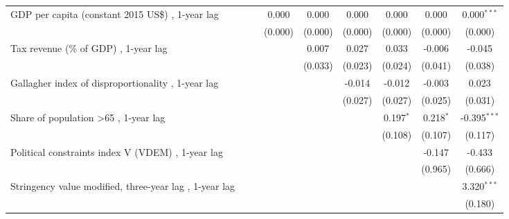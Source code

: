 \begin{table}[htbp]
\begin{tabular}{lcccccccc}
      GDP per capita (constant 2015 US\$) , 1-year lag                      &              &              & 0.000        & 0.000       & 0.000        & 0.000        & 0.000       & 0.000$^{***}$\\   
                                                                            &              &              & (0.000)      & (0.000)     & (0.000)      & (0.000)      & (0.000)     & (0.000)\\   
      Tax revenue (\% of GDP) , 1-year lag                                  &              &              &              & 0.007       & 0.027        & 0.033        & -0.006      & -0.045\\   
                                                                            &              &              &              & (0.033)     & (0.023)      & (0.024)      & (0.041)     & (0.038)\\   
      Gallagher index of disproportionality , 1-year lag                    &              &              &              &             & -0.014       & -0.012       & -0.003      & 0.023\\   
                                                                            &              &              &              &             & (0.027)      & (0.027)      & (0.025)     & (0.031)\\   
      Share of population >65 , 1-year lag                                  &              &              &              &             &              & 0.197$^{*}$  & 0.218$^{*}$ & -0.395$^{***}$\\   
                                                                            &              &              &              &             &              & (0.108)      & (0.107)     & (0.117)\\   
      Political constraints index V (VDEM) , 1-year lag                     &              &              &              &             &              &              & -0.147      & -0.433\\   
                                                                            &              &              &              &             &              &              & (0.965)     & (0.666)\\   
      Stringency value modified, three-year lag , 1-year lag                &              &              &              &             &              &              &             & 3.320$^{***}$\\   
                                                                            &              &              &              &             &              &              &             & (0.180)\\   

\end{tabular}
\end{table}
